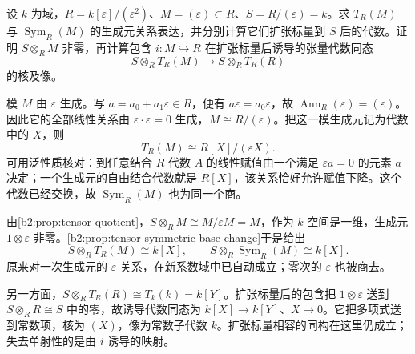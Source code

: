 \begin{exercise}\label{b2:ex:08-algebra-base-change}
	设 \(k\) 为域，\(R=k[\varepsilon]/(\varepsilon^2)\)、\(M=(\varepsilon)\subset R\)、\(S=R/(\varepsilon)=k\)。求 \(T_R(M)\) 与 \(\operatorname{Sym}_R(M)\) 的生成元关系表达，并分别计算它们扩张标量到 \(S\) 后的代数。证明 \(S\otimes_RM\) 非零，再计算包含 \(i:M\hookrightarrow R\) 在扩张标量后诱导的张量代数同态
	\[
		S\otimes_RT_R(M)\longrightarrow S\otimes_RT_R(R)
	\]
	的核及像。
\end{exercise}
\begin{solution}
	模 \(M\) 由 \(\varepsilon\) 生成。写 \(a=a_0+a_1\varepsilon\in R\)，便有 \(a\varepsilon=a_0\varepsilon\)，故 \(\operatorname{Ann}_R(\varepsilon)=(\varepsilon)\)。因此它的全部线性关系由 \(\varepsilon\cdot\varepsilon=0\) 生成，\(M\cong R/(\varepsilon)\)。把这一模生成元记为代数中的 \(X\)，则
	\[
		T_R(M)\cong R[X]/(\varepsilon X).
	\]
	可用泛性质核对：到任意结合 \(R\) 代数 \(A\) 的线性赋值由一个满足 \(\varepsilon a=0\) 的元素 \(a\) 决定；一个生成元的自由结合代数就是 \(R[X]\)，该关系恰好允许赋值下降。这个代数已经交换，故 \(\operatorname{Sym}_R(M)\) 也为同一个商。

	由\cref{b2:prop:tensor-quotient}，\(S\otimes_RM\cong M/\varepsilon M=M\)，作为 \(k\) 空间是一维，生成元 \(1\otimes\varepsilon\) 非零。\cref{b2:prop:tensor-symmetric-base-change}于是给出
	\[
		S\otimes_RT_R(M)\cong k[X],\qquad S\otimes_R\operatorname{Sym}_R(M)\cong k[X].
	\]
	原来对一次生成元的 \(\varepsilon\) 关系，在新系数域中已自动成立；零次的 \(\varepsilon\) 也被商去。

	另一方面，\(S\otimes_RT_R(R)\cong T_k(k)=k[Y]\)。扩张标量后的包含把 \(1\otimes\varepsilon\) 送到 \(S\otimes_RR\cong S\) 中的零，故诱导代数同态为 \(k[X]\to k[Y]\)、\(X\mapsto0\)。它把多项式送到常数项，核为 \((X)\)，像为常数子代数 \(k\)。扩张标量相容的同构在这里仍成立；失去单射性的是由 \(i\) 诱导的映射。
\end{solution}
